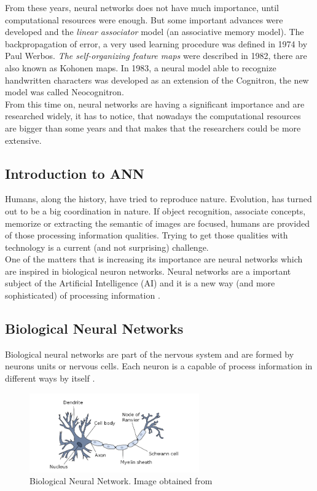 From these years, neural networks does not have much importance, until computational resources were enough. But some important advances were developed and the \textit{linear associator} model (an associative memory model). The backpropagation of error, a very used learning procedure was defined in 1974 by Paul Werbos. \textit{The self-organizing feature maps} were described in 1982, there are also known as Kohonen maps. In 1983, a neural model able to recognize handwritten characters was developed as an extension of the Cognitron, the new model was called Neocognitron.\\

From this time on, neural networks are having a significant importance and are researched widely, it has to notice, that nowadays the computational resources are bigger than some years and that makes that the researchers could be more extensive.\\

\subsection{Introduction to ANN}
Humans, along the history, have tried to reproduce nature. Evolution, has turned out to be a big coordination in nature. If object recognition, associate concepts, memorize or extracting the semantic of images are focused, humans are provided of those processing information qualities. Trying to get those qualities with technology is a current (and not surprising) challenge.\\

One of the matters that is increasing its importance are neural networks which are inspired in biological neuron networks. Neural networks are a important subject of the Artificial Intelligence (AI) and it is a new way (and more sophisticated) of processing information \cite{Rojas}.\\

\subsection{Biological Neural Networks}
Biological neural networks are part of the nervous system and are formed by neurons units or nervous cells. Each neuron is a capable of process information in different ways by itself \cite{Rojas}.\\

\begin{figure}[htb]
\centering
\includegraphics[width=0.65\textwidth]{images_miscelaneus/neuron.png}
\caption{Biological Neural Network. Image obtained from \cite{BINN}} \label{fig:Bio-Neuron}
\end{figure}


